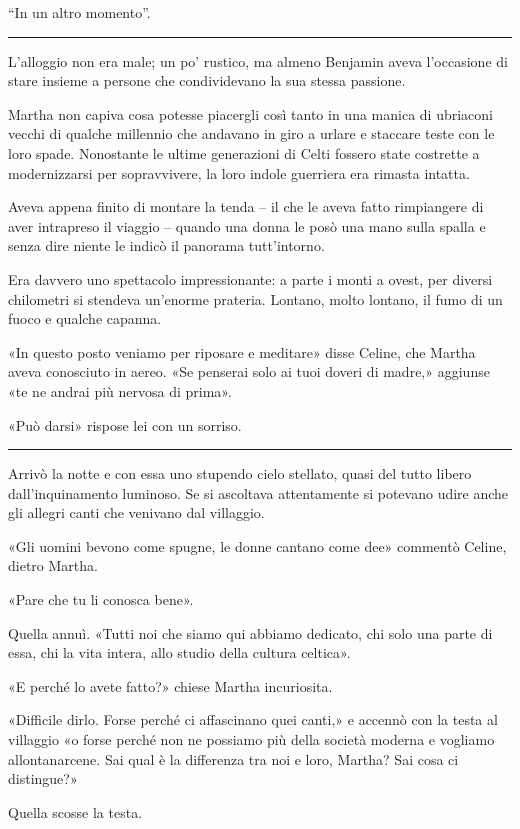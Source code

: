 ``In un altro momento''.

\plainbreak{1}

L’alloggio non era male; un po' rustico, ma almeno Benjamin aveva l'occasione di stare insieme a
persone che condividevano la sua stessa passione.

Martha non capiva cosa potesse piacergli così tanto in una manica di ubriaconi vecchi di qualche
millennio che andavano in giro a urlare e staccare teste con le loro spade. Nonostante le ultime
generazioni di Celti fossero state costrette a modernizzarsi per sopravvivere, la loro indole
guerriera era rimasta intatta.

Aveva appena finito di montare la tenda -- il che le aveva fatto rimpiangere di aver intrapreso il
viaggio -- quando una donna le posò una mano sulla spalla e senza dire niente le indicò il panorama
tutt'intorno.

Era davvero uno spettacolo impressionante: a parte i monti a ovest, per diversi chilometri si
stendeva un'enorme prateria. Lontano, molto lontano, il fumo di un fuoco e qualche capanna.

«In questo posto veniamo per riposare e meditare» disse Celine, che Martha aveva conosciuto in
aereo. «Se penserai solo ai tuoi doveri di madre,» aggiunse «te ne andrai più nervosa di prima».

«Può darsi» rispose lei con un sorriso.

\plainbreak{1}

Arrivò la notte e con essa uno stupendo cielo stellato, quasi del tutto libero dall'inquinamento
luminoso. Se si ascoltava attentamente si potevano udire anche gli allegri canti che venivano dal
villaggio.

«Gli uomini bevono come spugne, le donne cantano come dee» commentò Celine, dietro Martha.

«Pare che tu li conosca bene».

Quella annuì. «Tutti noi che siamo qui abbiamo dedicato, chi solo una parte di essa, chi la vita
intera, allo studio della cultura celtica».

«E perché lo avete fatto?» chiese Martha incuriosita.

«Difficile dirlo. Forse perché ci affascinano quei canti,» e accennò con la testa al villaggio «o
forse perché non ne possiamo più della società moderna e vogliamo allontanarcene. Sai qual è la
differenza tra noi e loro, Martha? Sai cosa ci distingue?»

Quella scosse la testa.

